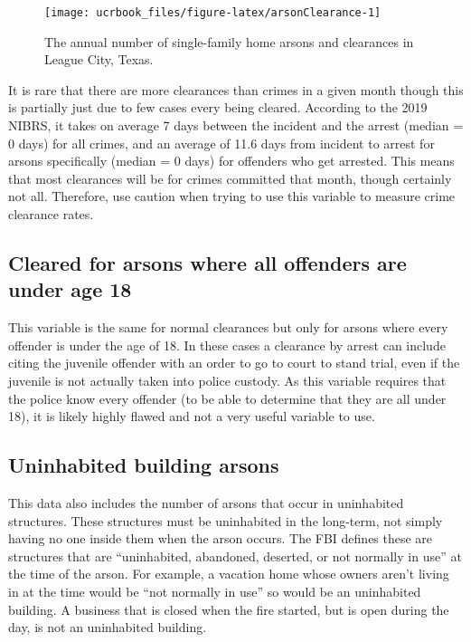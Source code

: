 \documentclass[
  12pt,
  openany]{book}
\begin{document}
\begin{figure}

{\centering \texttt{[image: ucrbook\_files/figure-latex/arsonClearance-1]} 

}

\caption{The annual number of single-family home arsons and clearances in League City, Texas.}\label{fig:arsonClearance}
\end{figure}

It is rare that there are more clearances than crimes in a given month though this is partially just due to few cases every being cleared. According to the 2019 NIBRS, it takes on average 7 days between the incident and the arrest (median = 0 days) for all crimes, and an average of 11.6 days from incident to arrest for arsons specifically (median = 0 days) for offenders who get arrested. This means that most clearances will be for crimes committed that month, though certainly not all. Therefore, use caution when trying to use this variable to measure crime clearance rates.

\hypertarget{cleared-for-arsons-where-all-offenders-are-under-age-18}{%
\subsection{Cleared for arsons where all offenders are under age 18}\label{cleared-for-arsons-where-all-offenders-are-under-age-18}}

This variable is the same for normal clearances but only for arsons where every offender is under the age of 18. In these cases a clearance by arrest can include citing the juvenile offender with an order to go to court to stand trial, even if the juvenile is not actually taken into police custody. As this variable requires that the police know every offender (to be able to determine that they are all under 18), it is likely highly flawed and not a very useful variable to use.

\hypertarget{uninhabited-building-arsons}{%
\subsection{Uninhabited building arsons}\label{uninhabited-building-arsons}}

This data also includes the number of arsons that occur in uninhabited structures. These structures must be uninhabited in the long-term, not simply having no one inside them when the arson occurs. The FBI defines these are structures that are ``uninhabited, abandoned, deserted, or not normally in use'' at the time of the arson. For example, a vacation home whose owners aren't living in at the time would be ``not normally in use'' so would be an uninhabited building. A business that is closed when the fire started, but is open during the day, is not an uninhabited building.
\end{document}
